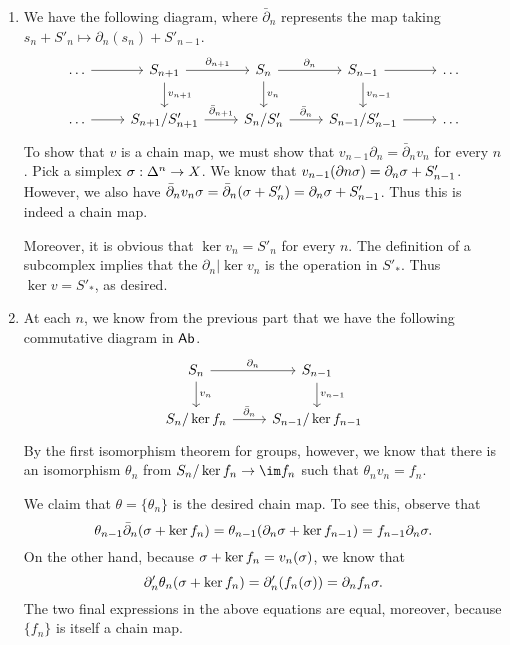 \documentclass[../../solutions.tex]{subfiles}
\begin{document}
\begin{exercise} \leavevmode
\begin{enumerate}
\item We have the following diagram, where $\bar\partial_n$ represents the map taking $s_n+S'_n\mapsto\partial_n(s_n)+S'_{n-1}$. 
\[\begin{tikzcd}
\dots\ar[r] & S_{n+1}\ar[d,"v_{n+1}"]\ar[r,"\partial_{n+1}"] & S_n\ar[d,"v_n"]\ar[r,"\partial_n"] & S_{n-1}\ar[d,"v_{n-1}"]\ar[r] & \dots \\ 
\dots\ar[r] & S_{n+1}/S'_{n+1}\ar[r,"\bar\partial_{n+1}"] & S_n/S'_n\ar[r,"\bar\partial_n"] & S_{n-1}/S'_{n-1}\ar[r] & \dots 
\end{tikzcd}\]
To show that $v$ is a chain map, we must show that $v_{n-1}\partial_n=\bar\partial_nv_n$ for every $n$. 
Pick a simplex $\sigma:\Delta^n\to X$. 
We know that $v_{n-1}(\partial n\sigma)=\partial_n\sigma+S'_{n-1}$. 
However, we also have $\bar\partial_nv_n\sigma=\bar\partial_n(\sigma+S'_n)=\partial_n\sigma+S'_{n-1}$. 
Thus this is indeed a chain map. 

Moreover, it is obvious that $\ker v_n=S'_n$ for every $n$. 
The definition of a subcomplex implies that the $\partial_n|\ker v_n$ is the operation in $S'_*$. 
Thus $\ker v=S'_*$, as desired. 

\item At each $n$, we know from the previous part that we have the following commutative diagram in $\mathsf{Ab}$. 
\[\begin{tikzcd}
S_n\ar[d,"v_n"]\ar[r,"\partial_n"] & S_{n-1}\ar[d,"v_{n-1}"] \\ 
S_n/\ker f_n\ar[r,"\bar\partial_n"] & S_{n-1}/\ker f_{n-1}
\end{tikzcd}\]
By the first isomorphism theorem for groups, however, we know that there is an isomorphism $\theta_n$ from $S_n/\ker f_n\to\im f_n$ such that $\theta_nv_n=f_n$. 

We claim that $\theta=\{\theta_n\}$ is the desired chain map. 
To see this, observe that \[\theta_{n-1}\bar\partial_n(\sigma+\ker f_n)=\theta_{n-1}(\partial_n\sigma+\ker f_{n-1})=f_{n-1}\partial_n\sigma.\] 
On the other hand, because $\sigma+\ker f_n=v_n(\sigma)$, we know that \[\partial'_n\theta_n(\sigma+\ker f_n)=\partial'_n(f_n(\sigma))=\partial_nf_n\sigma.\] 
The two final expressions in the above equations are equal, moreover, because $\{f_n\}$ is itself a chain map. 
\end{enumerate}
\end{exercise}
\end{document}
